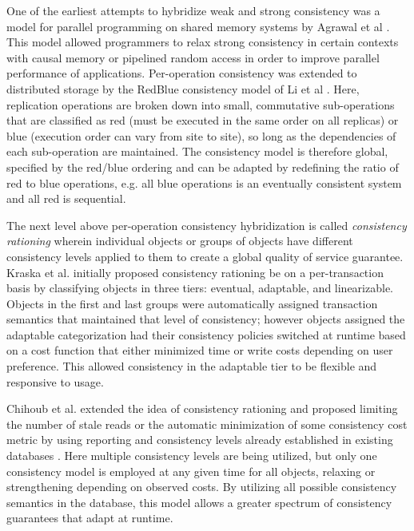 \documentclass[10pt,conference,letterpaper]{IEEEtran}
\begin{document}
One of the earliest attempts to hybridize weak and strong consistency was a
model for parallel programming on shared memory systems by Agrawal et al
\cite{agrawal_mixed_1994}.
This model allowed programmers to relax strong consistency in certain contexts
with causal memory or pipelined random access in order to improve parallel
performance of applications.
Per-operation consistency was extended to distributed storage by the RedBlue
consistency model of Li et al \cite{li_making_2012}.
Here, replication operations are broken down into small, commutative
sub-operations that are classified as red (must be executed in the same order
on all replicas) or blue (execution order can vary from site to site), so long
as the dependencies of each sub-operation are maintained.
The consistency model is therefore global, specified by the red/blue ordering
and can be adapted by redefining the ratio of red to blue operations, e.g.
all blue operations is an eventually consistent system and all red is
sequential.

The next level above per-operation consistency hybridization is called
\textit{consistency rationing} wherein individual objects or groups of objects
have different consistency levels applied to them to create a global quality
of service guarantee.
Kraska et al.
\cite{kraska_consistency_2009} initially proposed consistency rationing be on
a per-transaction basis by classifying objects in three tiers: eventual,
adaptable, and linearizable.
Objects in the first and last groups were automatically assigned transaction
semantics that maintained that level of consistency; however objects assigned
the adaptable categorization had their consistency policies switched at
runtime based on a cost function that either minimized time or write costs
depending on user preference.
This allowed consistency in the adaptable tier to be flexible and responsive
to usage.

Chihoub et al.
extended the idea of consistency rationing and proposed limiting the number of
stale reads or the automatic minimization of some consistency cost metric by
using reporting and consistency levels already established in existing
databases \cite{chihoub_harmony:_2012,chihoub_consistency_2013}.
Here multiple consistency levels are being utilized, but only one consistency
model is employed at any given time for all objects, relaxing or strengthening
depending on observed costs.
By utilizing all possible consistency semantics in the database, this model
allows a greater spectrum of consistency guarantees that adapt at runtime.
\end{document}

